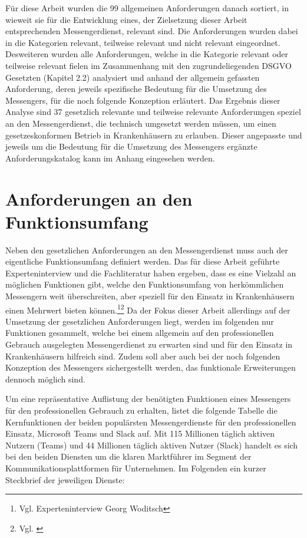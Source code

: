 Für diese Arbeit wurden die 99 allgemeinen Anforderungen danach sortiert, in wieweit sie für die Entwicklung eines, der Zielsetzung dieser Arbeit entsprechenden Messengerdienst, relevant sind. Die Anforderungen wurden dabei in die Kategorien relevant, teilweise relevant und nicht relevant eingeordnet. Desweiteren wurden alle Anforderungen, welche in die Kategorie relevant oder teilweise relevant fielen im Zusammenhang mit den zugrundeliegenden DSGVO Gesetzten (Kapitel 2.2) analysiert und anhand der allgemein gefassten Anforderung, deren jeweils spezifische Bedeutung für die Umsetzung des Messengers, für die noch folgende Konzeption erläutert. Das Ergebnis dieser Analyse sind 37 gesetzlich relevante und teilweise relevante Anforderungen speziel an den Messengerdienst, die technisch umgesetzt werden müssen, um einen gesetzeskonformen Betrieb in Krankenhäusern zu erlauben. Dieser angepasste und jeweils um die Bedeutung für die Umsetzung des Messengers ergänzte Anforderungskatalog kann im Anhang eingesehen werden.

\section{Anforderungen an den Funktionsumfang}\label{section:pdimsbd}
Neben den gesetzlichen Anforderungen an den Messengerdienst muss auch der eigentliche Funktionsumfang definiert werden. Das für diese Arbeit geführte Experteninterview und die Fachliteratur haben ergeben, dass es eine Vielzahl an möglichen Funktionen gibt, welche den Funktionsumfang von herkömmlichen Messengern weit überschreiten, aber speziell für den Einsatz in Krankenhäusern einen Mehrwert bieten können.\footnote{Vgl. Experteninterview Georg Woditsch}\footnote{Vgl. \cite[S. 19 4.]{Khan2020}}
Da der Fokus dieser Arbeit allerdings auf der Umsetzung der gesetzlichen Anforderungen liegt, werden im folgenden nur Funktionen gesammelt, welche bei einem allgemein auf den professionellen Gebrauch ausgelegten Messengerdienst zu erwarten sind und für den Einsatz in Krankenhäusern hilfreich sind. Zudem soll aber auch bei der noch folgenden Konzeption des Messengers sichergestellt werden, das funktionale Erweiterungen dennoch möglich sind.

Um eine repräsentative Auflistung der benötigten Funktionen eines Messengers für den professionellen Gebrauch zu erhalten, listet die folgende Tabelle die Kernfunktionen der beiden populärsten Messengerdienste für den professionellen Einsatz, Microsoft Teams und Slack auf.
Mit 115 Millionen täglich aktiven Nutzern (Teams) und 44 Millionen täglich aktiven Nutzer (Slack) handelt es sich bei den beiden Diensten um die klaren Marktführer im Segment der Kommunikationsplattformen für Unternehmen. Im Folgenden ein kurzer Steckbrief der jeweiligen Dienste:

